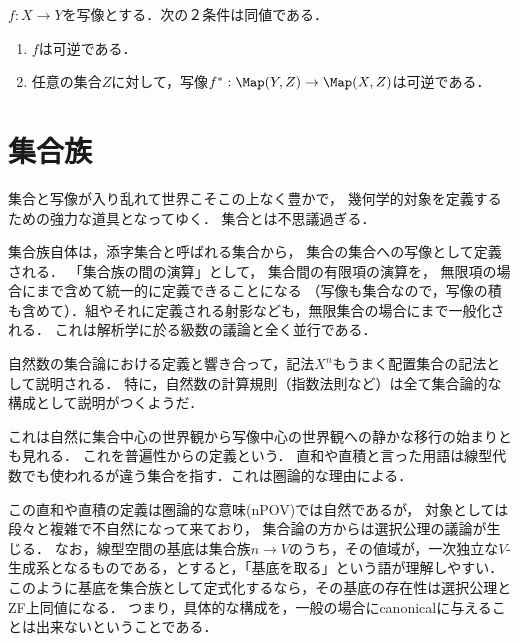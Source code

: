\documentclass[uplatex,dvipdfmx]{jsreport}
\begin{document}
\begin{proposition}
    $f:X\to Y$を写像とする．次の２条件は同値である．
    \begin{enumerate}
        \item $f$は可逆である．
        \item 任意の集合$Z$に対して，写像$f^*:\Map(Y,Z)\to\Map(X,Z)$は可逆である．
    \end{enumerate}
\end{proposition}

\section{集合族}

\begin{screen}
    集合と写像が入り乱れて世界こそこの上なく豊かで，
    幾何学的対象を定義するための強力な道具となってゆく．
    集合とは不思議過ぎる．

    集合族自体は，添字集合と呼ばれる集合から，
    集合の集合への写像として定義される．
    「集合族の間の演算」として，
    集合間の有限項の演算を，
    無限項の場合にまで含めて統一的に定義できることになる
    （写像も集合なので，写像の積も含めて）．組やそれに定義される射影なども，無限集合の場合にまで一般化される．
    これは解析学に於る級数の議論と全く並行である．

    自然数の集合論における定義と響き合って，記法$X^n$もうまく配置集合の記法として説明される．
    特に，自然数の計算規則（指数法則など）は全て集合論的な構成として説明がつくようだ．

    これは自然に集合中心の世界観から写像中心の世界観への静かな移行の始まりとも見れる．
    これを普遍性からの定義という．
    直和や直積と言った用語は線型代数でも使われるが違う集合を指す．これは圏論的な理由による．

    この直和や直積の定義は圏論的な意味(nPOV)では自然であるが，
    対象としては段々と複雑で不自然になって来ており，
    集合論の方からは選択公理の議論が生じる．
    なお，線型空間の基底は集合族$n\to V$のうち，その値域が，一次独立な$V$-生成系となるものである，とすると，「基底を取る」という語が理解しやすい．このように基底を集合族として定式化するなら，その基底の存在性は選択公理とZF上同値になる．
    つまり，具体的な構成を，一般の場合にcanonicalに与えることは出来ないということである．
\end{screen}
\end{document}
